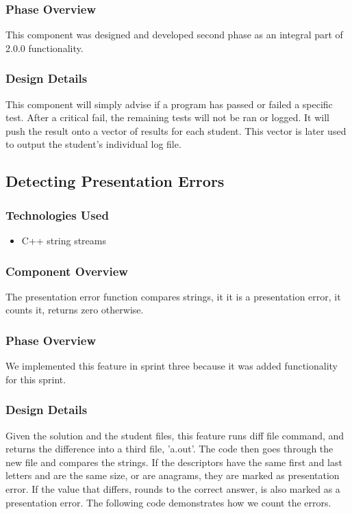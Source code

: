 \documentclass {article}
\begin{document}
			\subsubsection{\large{\color{cyan}Phase Overview}}
				This component was designed and developed second phase as an integral part of
				 2.0.0 functionality.

			\subsubsection{\large{\color{cyan}Design Details}}
				This component will simply advise if a program has passed or failed a specific
				 test.  After a critical fail, the remaining tests will not be ran or logged.
				 It will push the result onto a vector of results for each student. This vector is
				 later used to output the student's individual log file.
				 
				 
		\subsection{\Large{\color{blue}Detecting Presentation Errors}}
			\subsubsection{\large{\color{cyan}Technologies  Used}}
				\begin{itemize}
					\item C++ string streams
				\end{itemize}
			
			\subsubsection{\large{\color{cyan}Component Overview}}
				The presentation error function compares strings, it it is a presentation error,
				 it counts it, returns zero otherwise.
				 
			\subsubsection{\large{\color{cyan}Phase Overview}}
				We implemented this feature in sprint three because it was added functionality
				 for this sprint. 
				 
			\subsubsection{\large{\color{cyan}Design Details}}
				Given the solution and the student files, this feature runs diff file command, and
				 returns the difference into a third file, 'a.out'. The code then goes through
				 the new file and compares the strings. If the descriptors have the same first and
				 last letters and are the same size, or are anagrams, they are marked as
				 presentation error. If the value that differs, rounds to the correct answer, is 
				 also marked as a presentation error. The following code demonstrates
				 how we count the errors.
				 
\end{document}
